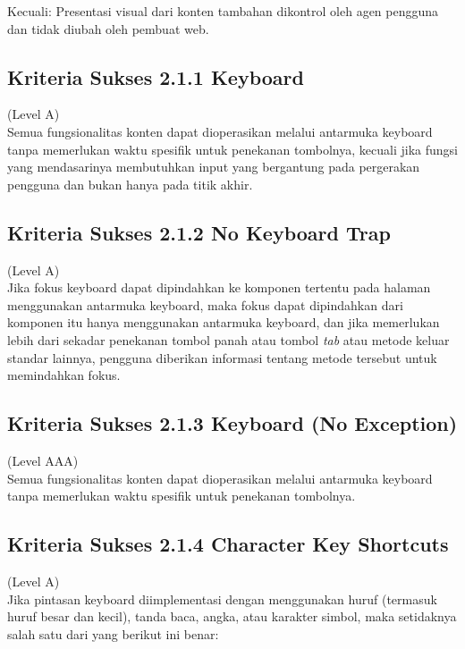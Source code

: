 Kecuali: Presentasi visual dari konten tambahan dikontrol oleh agen pengguna dan tidak diubah oleh pembuat web.


\subsection{Kriteria Sukses 2.1.1 Keyboard}
\label{subsec:kriteria_2.1.1}
(Level A) \\

Semua fungsionalitas konten dapat dioperasikan melalui antarmuka keyboard tanpa memerlukan waktu spesifik untuk penekanan tombolnya, kecuali jika fungsi yang mendasarinya membutuhkan input yang bergantung pada pergerakan pengguna dan bukan hanya pada titik akhir.

\subsection{Kriteria Sukses 2.1.2 No Keyboard Trap}
\label{subsec:kriteria_2.1.2}
(Level A) \\

Jika fokus keyboard dapat dipindahkan ke komponen tertentu pada halaman menggunakan antarmuka keyboard, maka fokus dapat dipindahkan dari komponen itu hanya menggunakan antarmuka keyboard, dan jika memerlukan lebih dari sekadar penekanan tombol panah atau tombol \textit{tab} atau metode keluar standar lainnya, pengguna diberikan informasi tentang metode tersebut untuk memindahkan fokus.

\subsection{Kriteria Sukses 2.1.3 Keyboard (No Exception)}
\label{subsec:kriteria_2.1.3}
(Level AAA) \\

Semua fungsionalitas konten dapat dioperasikan melalui antarmuka keyboard tanpa memerlukan waktu spesifik untuk penekanan tombolnya.

\subsection{Kriteria Sukses 2.1.4 Character Key Shortcuts}
\label{subsec:kriteria_2.1.4}
(Level A) \\

Jika pintasan keyboard diimplementasi dengan menggunakan huruf (termasuk huruf besar dan kecil), tanda baca, angka, atau karakter simbol, maka setidaknya salah satu dari yang berikut ini benar:

